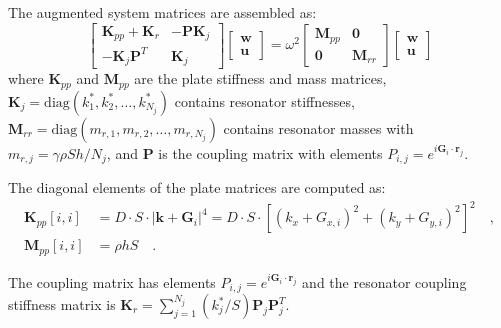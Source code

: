 \documentclass[review,numbers,sort&compress]{elsarticle}
\begin{document}
The augmented system matrices are assembled as:
\begin{equation}
\begin{bmatrix}
\mathbf{K}_{pp} + \mathbf{K}_r & -\mathbf{P}\mathbf{K}_j \\
-\mathbf{K}_j\mathbf{P}^T & \mathbf{K}_j
\end{bmatrix}
\begin{bmatrix}
\mathbf{w} \\ \mathbf{u}
\end{bmatrix} = \omega^2
\begin{bmatrix}
\mathbf{M}_{pp} & \mathbf{0} \\
\mathbf{0} & \mathbf{M}_{rr}
\end{bmatrix}
\begin{bmatrix}
\mathbf{w} \\ \mathbf{u}
\end{bmatrix}
\label{eq:augmented_eigenvalue_app}
\end{equation}
where $\mathbf{K}_{pp}$ and $\mathbf{M}_{pp}$ are the plate stiffness and mass matrices, $\mathbf{K}_j = \text{diag}(k_1^*, k_2^*, \ldots, k_{N_j}^*)$ contains resonator stiffnesses, $\mathbf{M}_{rr} = \text{diag}(m_{r,1}, m_{r,2}, \ldots, m_{r,N_j})$ contains resonator masses with $m_{r,j} = \gamma \rho S h / N_j$, and $\mathbf{P}$ is the coupling matrix with elements $P_{i,j} = e^{i\mathbf{G}_i \cdot \mathbf{r}_j}$.

The diagonal elements of the plate matrices are computed as:
\begin{align}
\mathbf{K}_{pp}[i,i] &= D \cdot S \cdot |\mathbf{k} + \mathbf{G}_i|^4 = D \cdot S \cdot [(k_x + G_{x,i})^2 + (k_y + G_{y,i})^2]^2 \quad,  \label{eq:stiffness_diagonal_app}\\
\mathbf{M}_{pp}[i,i] &= \rho h S \quad.  \label{eq:mass_diagonal_app}
\end{align}

The coupling matrix has elements $P_{i,j} = e^{i\mathbf{G}_i \cdot \mathbf{r}_j}$ and the resonator coupling stiffness matrix is $\mathbf{K}_r = \sum_{j=1}^{N_j} (k_j^*/S) \mathbf{P}_j \mathbf{P}_j^T$.
\end{document}
